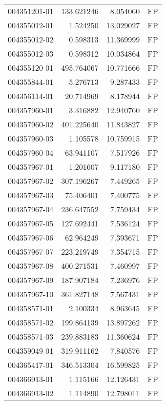 \begin{tabular}{lrrl}
004351201-01 &  133.621246 &       8.054060 &   FP \\
004355012-01 &    1.524250 &      13.029027 &   FP \\
004355012-02 &    0.598313 &      11.369999 &   FP \\
004355012-03 &    0.598312 &      10.034864 &   FP \\
004355120-01 &  495.764067 &      10.771666 &   FP \\
004355844-01 &    5.276713 &       9.287433 &   FP \\
004356114-01 &   20.714969 &       8.178944 &   FP \\
004357960-01 &    3.316882 &      12.940760 &   FP \\
004357960-02 &  401.225640 &      11.843827 &   FP \\
004357960-03 &    1.105578 &      10.759915 &   FP \\
004357960-04 &   63.941107 &       7.517926 &   FP \\
004357967-01 &    1.201607 &       9.117180 &   FP \\
004357967-02 &  307.196267 &       7.449265 &   FP \\
004357967-03 &   75.406401 &       7.400775 &   FP \\
004357967-04 &  236.647552 &       7.759434 &   FP \\
004357967-05 &  127.692441 &       7.536124 &   FP \\
004357967-06 &   62.964249 &       7.393671 &   FP \\
004357967-07 &  223.219749 &       7.354715 &   FP \\
004357967-08 &  400.271531 &       7.460997 &   FP \\
004357967-09 &  187.907184 &       7.236976 &   FP \\
004357967-10 &  361.827148 &       7.567431 &   FP \\
004358571-01 &    2.100334 &       8.963645 &   FP \\
004358571-02 &  199.864139 &      13.897262 &   FP \\
004358571-03 &  239.883183 &      11.360624 &   FP \\
004359049-01 &  319.911162 &       7.840576 &   FP \\
004365417-01 &  346.513304 &      16.599825 &   FP \\
004366913-01 &    1.115166 &      12.126431 &   FP \\
004366913-02 &    1.114890 &      12.798011 &   FP \\

\end{tabular}
